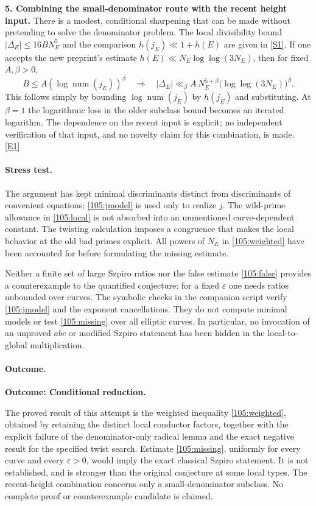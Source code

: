 \documentclass[11pt,a4paper]{article}
\newcommand{\sref}[2]{\hyperlink{source:#1:#2}{[S#2]}}
\newcommand{\eref}[2]{\hyperlink{extra:#1:#2}{[E#2]}}
\numberwithin{equation}{section}
\begin{document}
\medskip
\textbf{5. Combining the small-denominator route with the recent height input.}
There is a modest, conditional sharpening that can be made without pretending
to solve the denominator problem. The local divisibility bound
$|\Delta_E|\leq16 B N_E^5$ and the comparison
$h(j_E)\ll1+h(E)$ are given in \sref{105}{1}.
If one accepts the new preprint's estimate
$h(E)\ll N_E\log\log(3N_E)$, then for fixed $A,\beta>0$,
\[
 B\leq A(\log\operatorname{num}(j_E))^\beta
 \quad\Longrightarrow\quad
 |\Delta_E|\ll_\beta A\,
 N_E^{5+\beta}\bigl(\log\log(3N_E)\bigr)^\beta.
\]
This follows simply by bounding $\log\operatorname{num}(j_E)$ by $h(j_E)$
and substituting. At $\beta=1$ the logarithmic loss in the older subclass
bound becomes an iterated logarithm. The dependence on the recent input is
explicit; no independent verification of that input, and no novelty claim
for this combination, is made. \eref{105}{1}

\paragraph{Stress test.}
The argument has kept minimal discriminants distinct from discriminants of
convenient equations; \eqref{105:jmodel} is used only to realize $j$.
The wild-prime allowance in \eqref{105:local} is not absorbed into an
unmentioned curve-dependent constant. The twisting calculation imposes a
congruence that makes the local behavior at the old bad primes explicit.
All powers of $N_E$ in \eqref{105:weighted} have been accounted for before
formulating the missing estimate.

Neither a finite set of large Szpiro ratios nor the false estimate
\eqref{105:false} provides a counterexample to the quantified conjecture:
for a fixed $\varepsilon$ one needs ratios unbounded over curves. The symbolic
checks in the companion script verify \eqref{105:jmodel} and the exponent
cancellations. They do not compute minimal models or test
\eqref{105:missing} over all elliptic curves. In particular, no invocation
of an unproved $abc$ or modified Szpiro statement has been hidden in the
local-to-global multiplication.

\paragraph{Outcome.}
\textbf{Outcome: Conditional reduction.}

The proved result of this attempt is the weighted inequality
\eqref{105:weighted}, obtained by retaining the distinct local conductor
factors, together with the explicit failure of the denominator-only radical
lemma and the exact negative result for the specified twist search.
Estimate \eqref{105:missing}, uniformly for every curve and every
$\varepsilon>0$, would imply the exact classical Szpiro statement. It is
not established, and is stronger than the original conjecture at some local
types. The recent-height combination concerns only a small-denominator
subclass. No complete proof or counterexample candidate is claimed.
\end{document}
